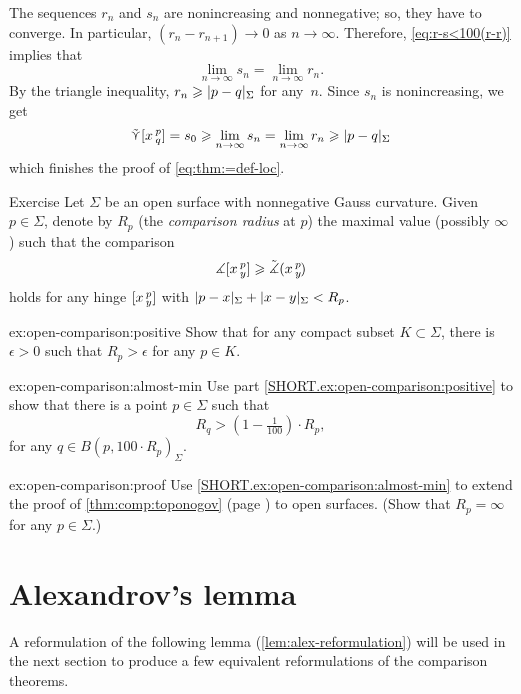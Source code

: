 The sequences $r_n$ and $s_n$ are nonincreasing and nonnegative;
so, they have to converge.
In particular, $(r_n-r_{n+1})\to0$ as $n\to \infty$.
Therefore, \ref{eq:r-s<100(r-r)} implies that
\[\lim_{n\to\infty}s_n=\lim_{n\to\infty}r_n.\]
By the triangle inequality, $r_n\ge \dist{p}{q}\Sigma$ for any~$n$.
Since $s_n$ is nonincreasing, we get
\[\side \hinge{x}p q=s_0\ge \lim_{n\to\infty}s_n=\lim_{n\to\infty}r_n\ge \dist{p}{q}\Sigma\]
which finishes the proof of \ref{eq:thm:=def-loc}.
\qeds

\begin{thm}{Exercise}\label{ex:open-comparison}
Let $\Sigma$ be an open surface with nonnegative Gauss curvature.
Given $p\in\Sigma$, denote by $R_p$ 
(the {}\emph{comparison radius} at $p$) 
the maximal value (possibly $\infty$) such that the comparison 
\[\measuredangle[x\,{}^{p}_{y}]
\geqslant\tilde\measuredangle(x\,{}^{p}_{y}\hspace{-0.2ex})\]
holds for any hinge $[x\,{}^{p}_{y}]$ with $\dist{p}{x}\Sigma+\dist{x}{y}\Sigma<R_p$.

\begin{subthm}{ex:open-comparison:positive}
Show that for any compact subset $K\subset \Sigma$, there is $\epsilon>0$ such that $R_p>\epsilon$ for any $p\in K$.
\end{subthm}

\begin{subthm}{ex:open-comparison:almost-min}
Use part \ref{SHORT.ex:open-comparison:positive} to show that 
there is a point $p\in\Sigma$ such that 
\[R_q>(1-\tfrac1{100})\cdot R_p,\]
for any $q\in B(p,100\cdot R_p)_\Sigma$.
\end{subthm}

\begin{subthm}{ex:open-comparison:proof}
Use \ref{SHORT.ex:open-comparison:almost-min} to extend the proof of \ref{thm:comp:toponogov} (page \pageref{proof(thm:comp:toponogov)}) to open surfaces. 
(Show that $R_p=\infty$ for any $p\in\Sigma$.) 
\end{subthm}

\end{thm}

\section{Alexandrov's lemma}

A reformulation of the following lemma (\ref{lem:alex-reformulation}) will be used in the next section to produce a few equivalent reformulations of the comparison theorems.

